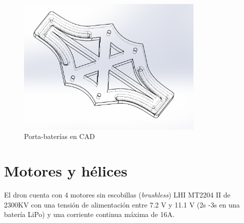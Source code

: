 \begin{itemize}
	\begin{figure}[htb!]
		\centering
		\includegraphics[width=0.8\textwidth]{hardware/lipo_support}
		\caption{Porta-baterías en CAD}
		\label{portam}
	\end{figure}
	
	  
\end{itemize} 

\section{Motores y hélices}
El dron cuenta con 4 motores sin escobillas (\textit{brushless}) LHI MT2204 II de 2300KV con una tensión de alimentación entre 7.2 V y 11.1 V (2s -3s en una batería LiPo) y una corriente continua máxima de 16A.

